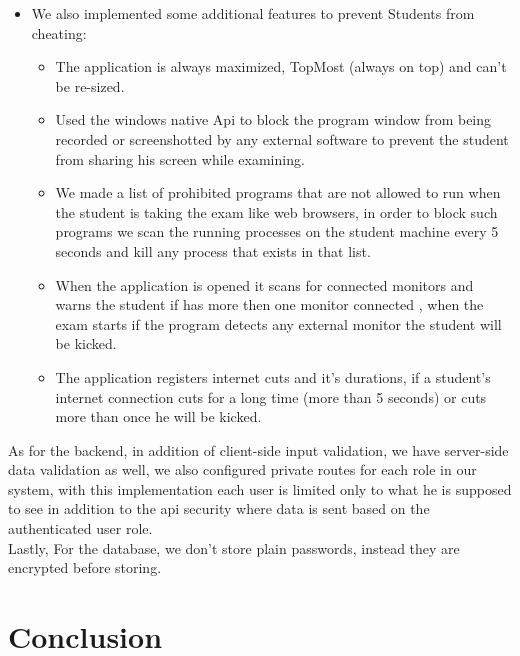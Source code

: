 \documentclass[]{uc2pfecaneva}
\begin{document}
\begin{itemize}
        \item We also implemented some additional features to prevent Students from cheating:
        \begin{itemize}
            \item The application is always maximized,  TopMost (always on top) and can’t be re-sized.
            \item Used the windows native Api to block the program window from being recorded or screenshotted by any external software to prevent the student from sharing his screen while examining.
            \item We made a list of prohibited programs that are not allowed to run when the student is taking the exam like web browsers, in order to block such programs we scan the running processes on the student machine every 5 seconds and kill any process that exists in that list.
            \item When the application is opened it scans for connected monitors and warns the student if has more then one monitor connected , when the exam  starts if the program detects any external monitor the student will be kicked.
            \item The application registers internet cuts and it's durations, if a student’s internet connection cuts for a long time (more than 5 seconds) or cuts more than once he will be kicked.
        \end{itemize}
    \end{itemize}

    \hspace*{8mm} As for the backend, in addition of client-side input validation, we have server-side data validation as well, we also configured private routes for each role in our system, with this implementation each user is limited only to what he is supposed to see in addition to the api security where data is sent based on the authenticated user role. \\
    \hspace*{8mm} Lastly, For the database, we don't store plain passwords, instead they are encrypted before storing.



    \section{Conclusion}
    \hspace*{8mm}
\end{document}
